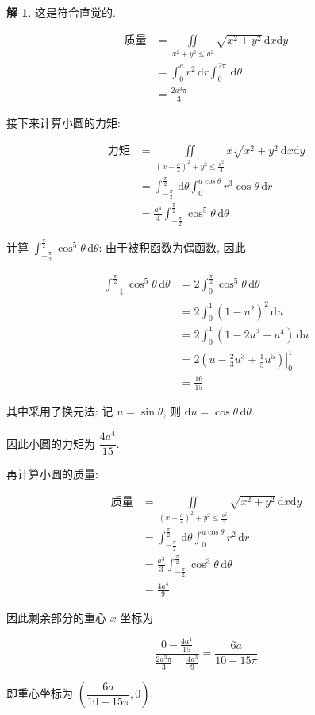 \documentclass[a4paper,12pt]{article}
\theoremstyle{definition}
\newtheorem*{sol}{解}
\begin{document}
\begin{sol}
    这是符合直觉的.

    \begin{align*}
        \text{质量}
         & =\iint\limits_{x^2+y^2\leq a^2}\sqrt{x^2+y^2}\,\mathrm{d}x\mathrm{d}y \\
         & =\int_0^a r^2\,\mathrm{d}r\int_0^{2\pi}\,\mathrm{d}\theta             \\
         & =\frac{2a^3\pi}{3}
    \end{align*}

    接下来计算小圆的力矩:

    \begin{align*}
        \text{力矩}
         & =\iint\limits_{\left(x-\frac{a}{2}\right)^2+y^2\leq\frac{a^2}{4}}x\sqrt{x^2+y^2}\,\mathrm{d}x\mathrm{d}y \\
         & =\int_{-\frac{\pi}{2}}^{\frac{\pi}{2}}\,\mathrm{d}\theta\int_0^{a\cos\theta}r^3\cos\theta\,\mathrm{d}r   \\
         & =\frac{a^4}{4}\int_{-\frac{\pi}{2}}^{\frac{\pi}{2}}\cos^5\theta\,\mathrm{d}\theta
    \end{align*}

    计算 $\displaystyle\int_{-\frac{\pi}{2}}^{\frac{\pi}{2}}\cos^5\theta\,\mathrm{d}\theta$: 由于被积函数为偶函数, 因此

    \begin{align*}
        \int_{-\frac{\pi}{2}}^{\frac{\pi}{2}}\cos^5\theta\,\mathrm{d}\theta
         & =2\int_0^{\frac{\pi}{2}}\cos^5\theta\,\mathrm{d}\theta          \\
         & =2\int_0^1(1-u^2)^2\,\mathrm{d}u                                \\
         & =2\int_0^1 (1-2u^2+u^4)\,\mathrm{d}u                            \\
         & =2\left.\left(u-\frac{2}{3}u^3+\frac{1}{5}u^5\right)\right|_0^1 \\
         & =\frac{16}{15}
    \end{align*}

    其中采用了换元法: 记 $u=\sin\theta$, 则 $\mathrm{d}u=\cos\theta\,\mathrm{d}\theta$.

    因此小圆的力矩为 $\dfrac{4a^4}{15}$.

    再计算小圆的质量:

    \begin{align*}
        \text{质量}
         & =\iint\limits_{\left(x-\frac{a}{2}\right)^2+y^2\leq\frac{a^2}{4}}\sqrt{x^2+y^2}\,\mathrm{d}x\mathrm{d}y \\
         & =\int_{-\frac{\pi}{2}}^{\frac{\pi}{2}}\,\mathrm{d}\theta\int_0^{a\cos\theta}r^2\,\mathrm{d}r            \\
         & =\frac{a^3}{3}\int_{-\frac{\pi}{2}}^{\frac{\pi}{2}}\cos^3\theta\,\mathrm{d}\theta                       \\
         & =\frac{4a^3}{9}
    \end{align*}

    因此剩余部分的重心 $x$ 坐标为

    $$\frac{0-\frac{4a^4}{15}}{\frac{2a^3\pi}{3}-\frac{4a^3}{9}}=\frac{6a}{10-15\pi}$$

    即重心坐标为 $\left(\dfrac{6a}{10-15\pi},0\right)$.
\end{sol}
\end{document}
